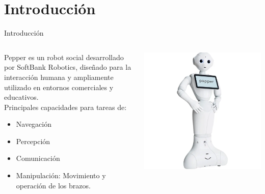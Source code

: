 \documentclass[spanish,10pt]{beamer}
\begin{document}
	\section{Introducción}
	\begin{frame}{Introducción}
	  \begin{columns}
		
		\begin{column}{0.6\textwidth}
			Pepper es un robot social desarrollado por SoftBank Robotics, diseñado para la interacción humana y ampliamente utilizado en entornos comerciales y educativos.\\[2em]
			
			Principales capacidades para tareas de:
			\begin{itemize}
				\item Navegación
				\item Percepción
				\item Comunicación
				\item Manipulación: Movimiento y operación de los brazos.
			\end{itemize}
		\end{column}
		
		\begin{column}{0.4\textwidth}
			\centering
			\includegraphics[width=\linewidth]{images/pepper-photo}
		\end{column}
		
	\end{columns}
	\end{frame}
		
\end{document}
